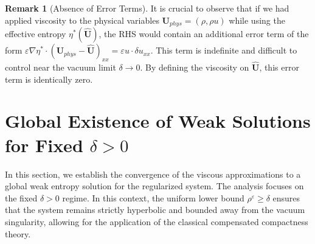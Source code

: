 \documentclass[12pt, reqno]{article}
\theoremstyle{definition}
\newtheorem{remark}[theorem]{Remark}
\numberwithin{equation}{section}
\begin{document}
\begin{remark}[Absence of Error Terms]
It is crucial to observe that if we had applied viscosity to the physical variables $\mathbf{U}_{phys} = (\rho, \rho u)$ while using the effective entropy $\eta^*(\hat{\mathbf{U}})$, the RHS would contain an additional error term of the form $\varepsilon \nabla \eta^* \cdot (\mathbf{U}_{phys} - \hat{\mathbf{U}})_{xx} = \varepsilon u \cdot \delta u_{xx}$. This term is indefinite and difficult to control near the vacuum limit $\delta \to 0$. By defining the viscosity on $\hat{\mathbf{U}}$, this error term is identically zero.
\end{remark}


\section{Global Existence of Weak Solutions for Fixed $\delta>0$}
\label{sec:existence}

In this section, we establish the convergence of the viscous approximations to a global weak entropy solution for the regularized system. The analysis focuses on the fixed $\delta > 0$ regime. In this context, the uniform lower bound $\rho^\varepsilon \ge \delta$ ensures that the system remains strictly hyperbolic and bounded away from the vacuum singularity, allowing for the application of the classical compensated compactness theory.
\end{document}
